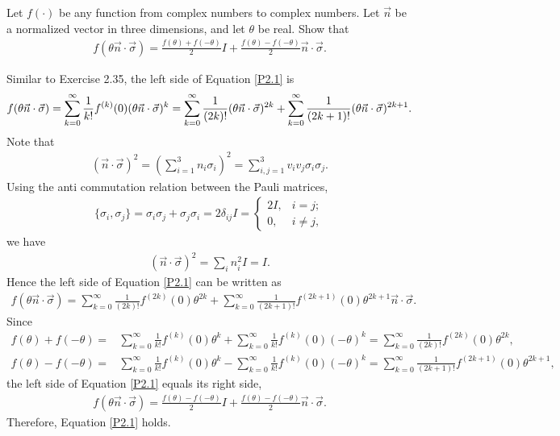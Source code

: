 \documentclass[en]{sol-man}
\begin{document}
\begin{prob}
    Let $f(\cdot)$ be any function from complex numbers to complex numbers. Let $\vec{n}$ be a normalized vector in three dimensions, and let $\theta$ be real. Show that
    \begin{align}
        \label{P2.1}
        f(\theta\vec{n}\cdot\vec{\sigma})=\frac{f(\theta)+f(-\theta)}{2}I+\frac{f(\theta)-f(-\theta)}{2}\vec{n}\cdot\vec{\sigma}.
    \end{align}
\end{prob}
\begin{pf}
    Similar to Exercise 2.35, the left side of Equation \eqref{P2.1} is
    \begin{align}
        \notag f(\theta\vec{n}\cdot\vec{\sigma})=\sum_{k=0}^{\infty}\frac{1}{k!}f^{(k)}(0)(\theta\vec{n}\cdot\vec{\sigma})^k=\sum_{k=0}^{\infty}\frac{1}{(2k)!}(\theta\vec{n}\cdot\vec{\sigma})^{2k}+\sum_{k=0}^{\infty}\frac{1}{(2k+1)!}(\theta\vec{n}\cdot\vec{\sigma})^{2k+1}.
    \end{align}
    Note that
    \begin{align}
        (\vec{n}\cdot\vec{\sigma})^2=\left(\sum_{i=1}^3n_i\sigma_i\right)^2=\sum_{i,j=1}^3v_iv_j\sigma_i\sigma_j.
    \end{align}
    Using the anti commutation relation between the Pauli matrices,
    \begin{align}
        \{\sigma_i,\sigma_j\}=\sigma_i\sigma_j+\sigma_j\sigma_i=2\delta_{ij}I=\left\{\begin{array}{ll}
            2I,&i=j;\\
            0,&i\neq j,
        \end{array}\right.
    \end{align}
    we have
    \begin{align}
        (\vec{n}\cdot\vec{\sigma})^2=\sum_in_i^2I=I.
    \end{align}
    Hence the left side of Equation \eqref{P2.1} can be written as
    \begin{align}
        f(\theta\vec{n}\cdot\vec{\sigma})=\sum_{k=0}^{\infty}\frac{1}{(2k)!}f^{(2k)}(0)\theta^{2k}+\sum_{k=0}^{\infty}\frac{1}{(2k+1)!}f^{(2k+1)}(0)\theta^{2k+1}\vec{n}\cdot\vec{\sigma}.
    \end{align}
    Since
    \begin{align}
        f(\theta)+f(-\theta)=&\sum_{k=0}^{\infty}\frac{1}{k!}f^{(k)}(0)\theta^k+\sum_{k=0}^{\infty}\frac{1}{k!}f^{(k)}(0)(-\theta)^k=\sum_{k=0}^{\infty}\frac{1}{(2k)!}f^{(2k)}(0)\theta^{2k},\\
        f(\theta)-f(-\theta)=&\sum_{k=0}^{\infty}\frac{1}{k!}f^{(k)}(0)\theta^k-\sum_{k=0}^{\infty}\frac{1}{k!}f^{(k)}(0)(-\theta)^k=\sum_{k=0}^{\infty}\frac{1}{(2k+1)!}f^{(2k+1)}(0)\theta^{2k+1},
    \end{align}
    the left side of Equation \eqref{P2.1} equals its right side,
    \begin{align}
        f(\theta\vec{n}\cdot\vec{\sigma})=\frac{f(\theta)-f(-\theta)}{2}I+\frac{f(\theta)-f(-\theta)}{2}\vec{n}\cdot\vec{\sigma}.
    \end{align}
    Therefore, Equation \eqref{P2.1} holds.
\end{pf}
\end{document}
